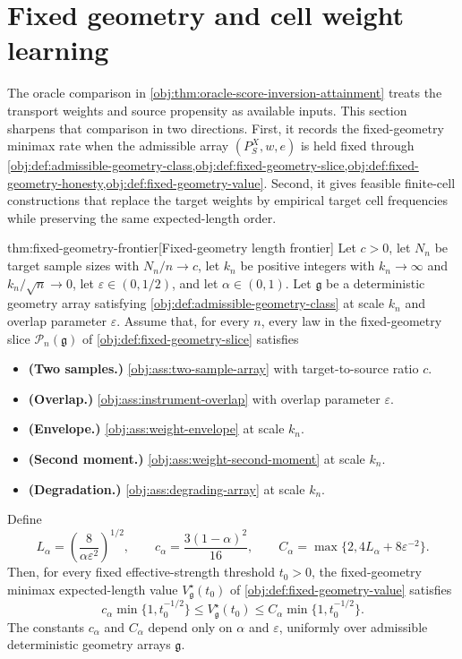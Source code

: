 \section{Fixed geometry and cell weight learning}

The oracle comparison in \cref{obj:thm:oracle-score-inversion-attainment} treats the transport weights and source propensity as available inputs. This section sharpens that comparison in two directions. First, it records the fixed-geometry minimax rate when the admissible array \((P_S^X,w,e)\) is held fixed through \cref{obj:def:admissible-geometry-class,obj:def:fixed-geometry-slice,obj:def:fixed-geometry-honesty,obj:def:fixed-geometry-value}. Second, it gives feasible finite-cell constructions that replace the target weights by empirical target cell frequencies while preserving the same expected-length order.

\begin{theoremv}{thm:fixed-geometry-frontier}[Fixed-geometry length frontier]
Let \(c>0\), let \(N_n\) be target sample sizes with \(N_n/n\to c\), let \(k_n\) be positive integers with \(k_n\to\infty\) and \(k_n/\sqrt n\to0\), let \(\varepsilon\in(0,1/2)\), and let \(\alpha\in(0,1)\).  Let \(\mathfrak g\) be a deterministic geometry array satisfying \cref{obj:def:admissible-geometry-class} at scale \(k_n\) and overlap parameter \(\varepsilon\).  Assume that, for every \(n\), every law in the fixed-geometry slice \(\mathcal P_n(\mathfrak g)\) of \cref{obj:def:fixed-geometry-slice} satisfies
\begin{itemize}
\item \textbf{(Two samples.)} \cref{obj:ass:two-sample-array} with target-to-source ratio \(c\).
\item \textbf{(Overlap.)} \cref{obj:ass:instrument-overlap} with overlap parameter \(\varepsilon\).
\item \textbf{(Envelope.)} \cref{obj:ass:weight-envelope} at scale \(k_n\).
\item \textbf{(Second moment.)} \cref{obj:ass:weight-second-moment} at scale \(k_n\).
\item \textbf{(Degradation.)} \cref{obj:ass:degrading-array} at scale \(k_n\).
\end{itemize}
Define
\[
L_\alpha=\left(\frac{8}{\alpha\varepsilon^2}\right)^{1/2},
\qquad
c_\alpha=\frac{3(1-\alpha)^2}{16},
\qquad
C_\alpha=\max\{2,4L_\alpha+8\varepsilon^{-2}\}.
\]
Then, for every fixed effective-strength threshold \(t_0>0\), the fixed-geometry minimax expected-length value \(V_{\mathfrak g}^\star(t_0)\) of \cref{obj:def:fixed-geometry-value} satisfies
\[
c_\alpha\min\{1,t_0^{-1/2}\}
\le
V_{\mathfrak g}^\star(t_0)
\le
C_\alpha\min\{1,t_0^{-1/2}\}.
\]
The constants \(c_\alpha\) and \(C_\alpha\) depend only on \(\alpha\) and \(\varepsilon\), uniformly over admissible deterministic geometry arrays \(\mathfrak g\).
\end{theoremv}

